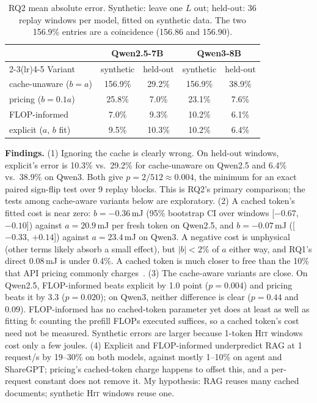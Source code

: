\documentclass[conference]{IEEEtran}
\begin{document}
\begin{table}[t]
\caption{RQ2 mean absolute error. Synthetic: leave one $L$ out; held-out: 36 replay windows per model, fitted on synthetic data. The two 156.9\% entries are a coincidence (156.86 and 156.90).}
\label{tab:rq2}
\centering
\footnotesize
\setlength{\tabcolsep}{4.5pt}
\begin{tabular}{@{}lcccc@{}}
\toprule
 & \multicolumn{2}{c}{Qwen2.5-7B} & \multicolumn{2}{c}{Qwen3-8B} \\
\cmidrule(lr){2-3}\cmidrule(lr){4-5}
Variant & synthetic & held-out & synthetic & held-out \\
\midrule
cache-unaware ($b=a$)   & 156.9\% & 29.2\% & 156.9\% & 38.9\% \\
pricing ($b=0.1a$)      & 25.8\%  & 7.0\%  & 23.1\%  & 7.6\% \\
FLOP-informed           & 7.0\%   & 9.3\%  & 10.2\%  & 6.1\% \\
explicit ($a$, $b$ fit) & 9.5\%   & 10.3\% & 10.2\%  & 6.4\% \\
\bottomrule
\end{tabular}
\end{table}

\textbf{Findings.} (1) Ignoring the cache is clearly wrong. On held-out windows, explicit's error is 10.3\% vs.\ 29.2\% for cache-unaware on Qwen2.5 and 6.4\% vs.\ 38.9\% on Qwen3. Both give $p=2/512\approx0.004$, the minimum for an exact paired sign-flip test over 9 replay blocks. This is RQ2's primary comparison; the tests among cache-aware variants below are exploratory. (2) A cached token's fitted cost is near zero: $b=-0.36$\,mJ (95\% bootstrap CI over windows [$-0.67$, $-0.10$]) against $a=20.9$\,mJ per fresh token on Qwen2.5, and $b=-0.07$\,mJ ([$-0.33$, $+0.14$]) against $a=23.4$\,mJ on Qwen3. A negative cost is unphysical (other terms likely absorb a small effect), but $|b|<2\%$ of $a$ either way, and RQ1's direct 0.08\,mJ is under 0.4\%. A cached token is much closer to free than the 10\% that API pricing commonly charges~\cite{openai,anthropic}. (3) The cache-aware variants are close. On Qwen2.5, FLOP-informed beats explicit by 1.0 point ($p=0.004$) and pricing beats it by 3.3 ($p=0.020$); on Qwen3, neither difference is clear ($p=0.44$ and $0.09$). FLOP-informed has no cached-token parameter yet does at least as well as fitting $b$: counting the prefill FLOPs executed suffices, so a cached token's cost need not be measured. Synthetic errors are larger because 1-token \textsc{Hit} windows cost only a few joules. (4) Explicit and FLOP-informed underpredict RAG at 1 request/s by 19--30\% on both models, against mostly 1--10\% on agent and ShareGPT; pricing's cached-token charge happens to offset this, and a per-request constant does not remove it. My hypothesis: RAG reuses many cached documents; synthetic \textsc{Hit} windows reuse one.
\end{document}
